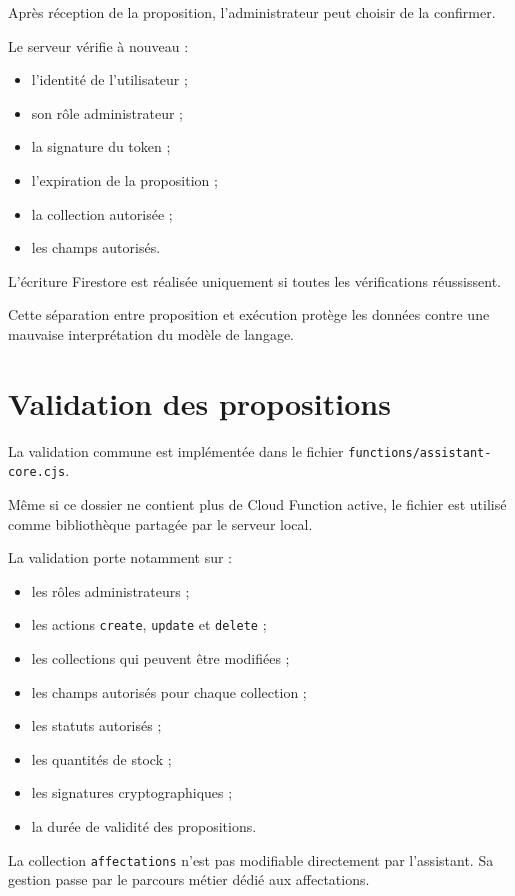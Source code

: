 \documentclass{rapportENSIAS}
\begin{document}
Après réception de la proposition, l’administrateur peut choisir de la confirmer.

Le serveur vérifie à nouveau :

\begin{itemize}
    \item l’identité de l’utilisateur ;
    \item son rôle administrateur ;
    \item la signature du token ;
    \item l’expiration de la proposition ;
    \item la collection autorisée ;
    \item les champs autorisés.
\end{itemize}

L’écriture Firestore est réalisée uniquement si toutes les vérifications réussissent.

Cette séparation entre proposition et exécution protège les données contre une mauvaise interprétation du modèle de langage.

\section{Validation des propositions}

La validation commune est implémentée dans le fichier \texttt{functions/assistant-core.cjs}.

Même si ce dossier ne contient plus de Cloud Function active, le fichier est utilisé comme bibliothèque partagée par le serveur local.

La validation porte notamment sur :

\begin{itemize}
    \item les rôles administrateurs ;
    \item les actions \texttt{create}, \texttt{update} et \texttt{delete} ;
    \item les collections qui peuvent être modifiées ;
    \item les champs autorisés pour chaque collection ;
    \item les statuts autorisés ;
    \item les quantités de stock ;
    \item les signatures cryptographiques ;
    \item la durée de validité des propositions.
\end{itemize}

La collection \texttt{affectations} n’est pas modifiable directement par l’assistant. Sa gestion passe par le parcours métier dédié aux affectations.
\end{document}
